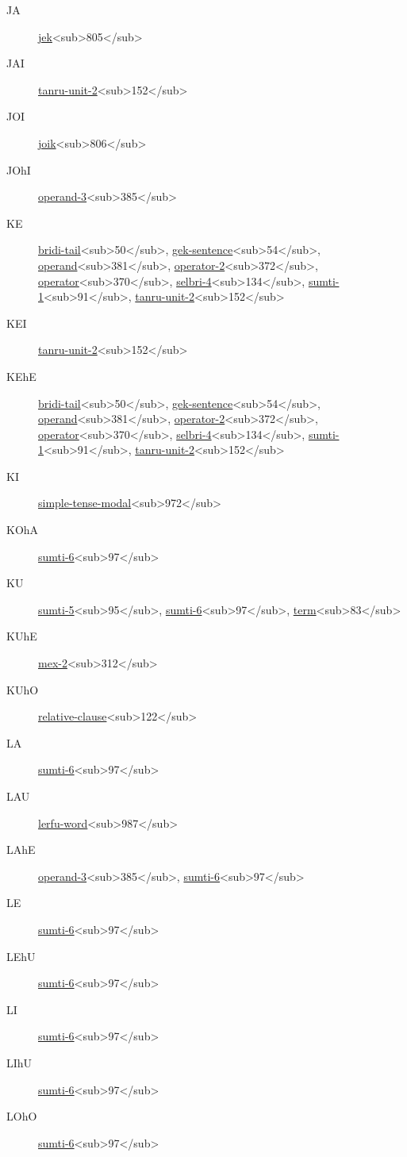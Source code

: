 \begin{description}
\item[JA] \hyperref[html:b805]{jek}<sub>805</sub>
\item[JAI] \hyperref[html:b152]{tanru-unit-2}<sub>152</sub>
\item[JOI] \hyperref[html:b806]{joik}<sub>806</sub>
\item[JOhI] \hyperref[html:b385]{operand-3}<sub>385</sub>
\item[KE] \hyperref[html:b50]{bridi-tail}<sub>50</sub>, \hyperref[html:b54]{gek-sentence}<sub>54</sub>, \hyperref[html:b381]{operand}<sub>381</sub>, \hyperref[html:b372]{operator-2}<sub>372</sub>, \hyperref[html:b370]{operator}<sub>370</sub>, \hyperref[html:b134]{selbri-4}<sub>134</sub>, \hyperref[html:b91]{sumti-1}<sub>91</sub>, \hyperref[html:b152]{tanru-unit-2}<sub>152</sub>
\item[KEI] \hyperref[html:b152]{tanru-unit-2}<sub>152</sub>
\item[KEhE] \hyperref[html:b50]{bridi-tail}<sub>50</sub>, \hyperref[html:b54]{gek-sentence}<sub>54</sub>, \hyperref[html:b381]{operand}<sub>381</sub>, \hyperref[html:b372]{operator-2}<sub>372</sub>, \hyperref[html:b370]{operator}<sub>370</sub>, \hyperref[html:b134]{selbri-4}<sub>134</sub>, \hyperref[html:b91]{sumti-1}<sub>91</sub>, \hyperref[html:b152]{tanru-unit-2}<sub>152</sub>
\item[KI] \hyperref[html:b972]{simple-tense-modal}<sub>972</sub>
\item[KOhA] \hyperref[html:b97]{sumti-6}<sub>97</sub>
\item[KU] \hyperref[html:b95]{sumti-5}<sub>95</sub>, \hyperref[html:b97]{sumti-6}<sub>97</sub>, \hyperref[html:b83]{term}<sub>83</sub>
\item[KUhE] \hyperref[html:b312]{mex-2}<sub>312</sub>
\item[KUhO] \hyperref[html:b122]{relative-clause}<sub>122</sub>
\item[LA] \hyperref[html:b97]{sumti-6}<sub>97</sub>
\item[LAU] \hyperref[html:b987]{lerfu-word}<sub>987</sub>
\item[LAhE] \hyperref[html:b385]{operand-3}<sub>385</sub>, \hyperref[html:b97]{sumti-6}<sub>97</sub>
\item[LE] \hyperref[html:b97]{sumti-6}<sub>97</sub>
\item[LEhU] \hyperref[html:b97]{sumti-6}<sub>97</sub>
\item[LI] \hyperref[html:b97]{sumti-6}<sub>97</sub>
\item[LIhU] \hyperref[html:b97]{sumti-6}<sub>97</sub>
\item[LOhO] \hyperref[html:b97]{sumti-6}<sub>97</sub>

\end{description}
